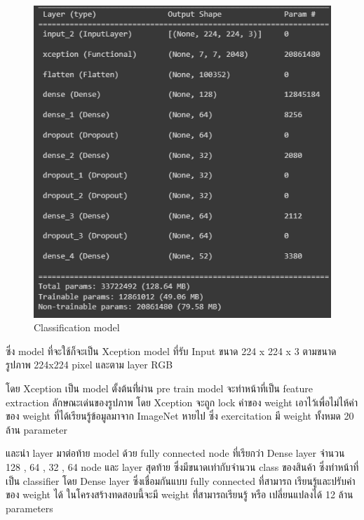 \begin{figure}[h]
  \begin{center}

    \includegraphics[scale=0.6]{pic/model/model.png}

  \end{center}

  \caption[Classification model]{Classification model}
  \label{fig:Classification model}
\end{figure}



ซึ่ง model ที่จะใช้ก็จะเป็น Xception model ที่รับ Input ขนาด 224 x 224 x 3 ตามขนาดรูปภาพ 224x224 pixel และตาม layer RGB

โดย Xception เป็น model ตั้งต้นที่่ผ่าน pre train model จะทำหน้าที่เป็น feature extraction  ลักษณะเด่นของรูปภาพ
โดย Xception จะถูก lock ค่าของ weight เอาไว้เพื่อไม่ไห้ค่าของ weight ที่ได้เรียนรู้ข้อมูลมาจาก ImageNet หายไป
ซึ่ง exercitation มี weight ทั้งหมด 20 ล้าน parameter

และนำ layer มาต่อท้าย model ด้วย fully connected node ที่เรียกว่า Dense layer จำนวน 128 , 64 , 32 ,  64 node และ
layer สุดท้าย ซึ่งมีขนาดเท่ากับจำนวน class ของสินค้า ซึ่งทำหน้าที่เป็น classifier
โดย Dense layer ซึ่งเชื่อมกันแบบ fully connected ที่สามารถ เรียนรู้และปรับค่าของ weight ได้
ในโครงสร้างทดสอบนี้จะมี weight ที่่สามารถเรียนรู้ หรือ เปลี่ยนแปลงได้ 12 ล้าน parameters


